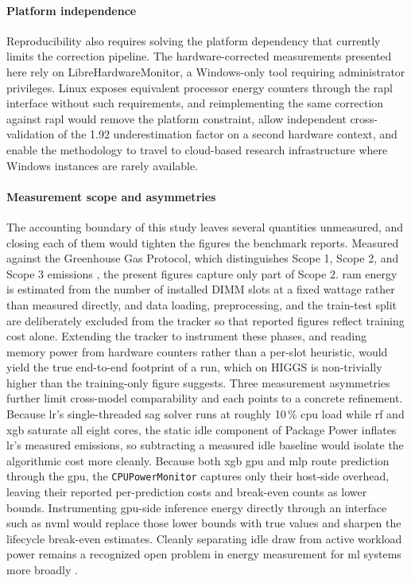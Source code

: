 \paragraph{Platform independence}
Reproducibility also requires solving the platform dependency that currently limits the correction pipeline. The hardware-corrected measurements presented here rely on LibreHardwareMonitor, a Windows-only tool requiring administrator privileges. Linux exposes equivalent processor energy counters through the \gls{rapl} interface without such requirements, and reimplementing the same correction against \gls{rapl} would remove the platform constraint, allow independent cross-validation of the 1.92 underestimation factor on a second hardware context, and enable the methodology to travel to cloud-based research infrastructure where Windows instances are rarely available.

\paragraph{Measurement scope and asymmetries}
The accounting boundary of this study leaves several quantities unmeasured, and closing each of them would tighten the figures the benchmark reports. Measured against the Greenhouse Gas Protocol, which distinguishes Scope 1, Scope 2, and Scope 3 emissions \cite{dodgeMeasuringCarbonIntensity2022,liMakingAILess2025}, the present figures capture only part of Scope 2. \gls{ram} energy is estimated from the number of installed DIMM slots at a fixed wattage rather than measured directly, and data loading, preprocessing, and the train-test split are deliberately excluded from the tracker so that reported figures reflect training cost alone. Extending the tracker to instrument these phases, and reading memory power from hardware counters rather than a per-slot heuristic, would yield the true end-to-end footprint of a run, which on HIGGS is non-trivially higher than the training-only figure suggests. Three measurement asymmetries further limit cross-model comparability and each points to a concrete refinement. Because \gls{lr}'s single-threaded \gls{sag} solver runs at roughly 10\,\% \gls{cpu} load while \gls{rf} and \gls{xgb} saturate all eight cores, the static idle component of Package Power inflates \gls{lr}'s measured emissions, so subtracting a measured idle baseline would isolate the algorithmic cost more cleanly. Because both \gls{xgb} \gls{gpu} and \gls{mlp} route prediction through the \gls{gpu}, the \texttt{CPUPowerMonitor} captures only their host-side overhead, leaving their reported per-prediction costs and break-even counts as lower bounds. Instrumenting \gls{gpu}-side inference energy directly through an interface such as \gls{nvml} would replace those lower bounds with true values and sharpen the lifecycle break-even estimates. Cleanly separating idle draw from active workload power remains a recognized open problem in energy measurement for \gls{ml} systems more broadly \cite{tschandMLPerfPowerBenchmarking2025}.

